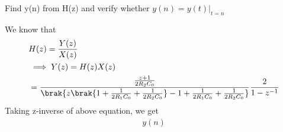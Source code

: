 \item Find y(n) from H(z) and verify whether $y(n)=y(t)|_{t=n}$
	
	\solution We know that 
	\begin{align}
		&H(z)=\frac{Y(z)}{X(z)}\\
		&\implies Y(z)=H(z)X(z)\\
			&=\frac{\frac{z+1}{2R_2C_0}}{\brak{z\brak{1+\frac{1}{2R_1C_0}+\frac{1}{2R_2C_0}}-1+\frac{1}{2R_1C_0}+\frac{1}{2R_2C_0}}}\frac{2}{1-z^{-1}}
	\end{align}
	Taking z-inverse of above equation, we get
	\begin{align}
		y(n)
	\end{align}

